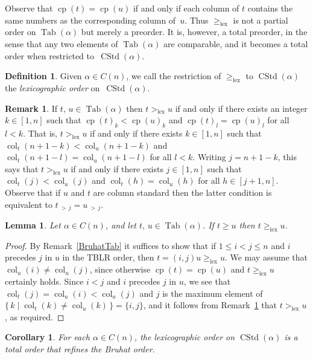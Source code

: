 \documentclass[10pt]{amsart}
\newtheorem{lemm}[theo]{Lemma}
\newtheorem{coro}[theo]{Corollary}
\theoremstyle{definition}
\newtheorem{defi}[theo]{Definition}
\newtheorem{rema}[theo]{Remark}
\DeclareMathOperator{\cp}{cp}
\DeclareMathOperator{\lex}{lex}
\DeclareMathOperator{\col}{col}
\newcommand{\morethan}[2]{#1\,{_{>\,#2}}}
\DeclareMathOperator{\CSTD}{CStd}
\DeclareMathOperator{\Tab}{Tab}
\begin{document}
Observe that $\cp(t)=\cp(u)$ if and only if each column of $t$
contains the same numbers as the corresponding column of~$u$. Thus
$\geqslant_{\lex}$ is not a partial order on $\Tab(\alpha)$ but
merely a preorder. It is, however, a total preorder, in the sense that
any two elements of $\Tab(\alpha)$ are comparable, and it becomes a total order
when restricted to~$\CSTD(\alpha)$.

\begin{defi}\label{Lexicographic Order Tableaux} Given $\alpha\in C(n)$,
we call the restriction of $\geqslant_{\lex}$ to $\CSTD(\alpha)$
the \emph{lexicographic order} on~$\CSTD(\alpha)$.
\end{defi}

\begin{rema}\label{LexTableauEquiv}
If $t,\,u\in\Tab(\alpha)$ then $t>_{\lex}u$ if and only if
there exists an integer $k\in[1,n]$ such
that $\cp(t)_k<\cp(u)_k$ and $\cp(t)_l=\cp(u)_l$ for all $l<k$.
That is, $t>_{\lex}u$ if and only if there exists $k\in[1,n]$ such
that $\col_t(n+1-k)<\col_u(n+1-k)$ and $\col_t(n+1-l)=\col_u(n+1-l)$
for all $l<k$. Writing $j=n+1-k$, this says that $t>_{\lex}u$ if
and only if there exists $j\in[1,n]$ such that $\col_t(j)<\col_u(j)$
and $\col_t(h)=\col_u(h)$ for all $h\in[j+1,n]$. Observe that if
$u$ and $t$ are column standard then the latter condition
is equivalent to $\morethan tj =\morethan uj$.
\end{rema}

\begin{lemm}\label{bruhatimplieslextableau}
Let $\alpha\in C(n)$, and let $t,\,u\in\Tab(\alpha)$. If
$t\geqslant u$ then $t\geqslant_{\lex} u$.
\end{lemm}

\begin{proof}
By Remark~\ref{BruhatTab} it suffices to show that if $1\leqslant i<j\leqslant n$
and $i$ precedes $j$ in $u$ in the TBLR order, then
$t=(i,j)u\geqslant_{\lex}u$. We may assume that $\col_u(i)\ne\col_u(j)$, since
otherwise $\cp(t)=\cp(u)$ and $t\geqslant_{\lex}u$ certainly holds.
Since $i<j$ and $i$ precedes $j$ in $u$, we see that $\col_t(j)=\col_u(i)<\col_u(j)$
and $j$ is the maximum element of $\{\,k\mid\col_t(k)\ne\col_u(k)\,\}=\{i,j\}$,
and it follows from Remark~\ref{LexTableauEquiv} that $t>_{\lex}u$, as required.
\end{proof}

\begin{coro}\label{domimplieslextableau}
For each $\alpha\in C(n)$, the lexicographic order on $\CSTD(\alpha)$
is a total order that refines the Bruhat order.
\end{coro}
\end{document}
